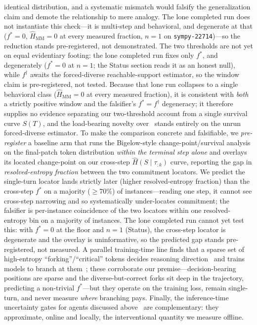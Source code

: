\documentclass[11pt]{article}
\newcommand{\strat}{S}
\newcommand{\prefix}{\tau_{:k}}
\begin{document}
identical distribution, and a systematic mismatch would falsify the generalization
claim and demote the relationship to mere analogy. The lone completed run does not
instantiate this check---it is multi-step and behavioral, and degenerate at that
($f^\ast=0$, $\widehat{H}_{\mathrm{MM}}=0$ at every measured fraction, $n\!=\!1$ on
\texttt{sympy-22714})---so the reduction stands pre-registered, not demonstrated. The two thresholds
are not yet on equal evidentiary footing: the lone completed run fixes only $f^\ast$,
and degenerately ($f^\ast=0$ at $n\!=\!1$; the Status section reads it as an honest
null), while $f^\dagger$ awaits the forced-diverse reachable-support estimator, so the
window claim is pre-registered, not tested. Because that lone run collapses to a
single behavioral class ($\widehat{H}_{\mathrm{MM}}=0$ at every measured fraction),
it is consistent with \emph{both} a strictly positive window and the falsifier's
$f^\ast=f^\dagger$ degeneracy; it therefore supplies no evidence separating our
two-threshold account from a single survival curve $S(T)$, and the load-bearing
novelty over~\citep{bigelow2024forking} stands entirely on the unrun forced-diverse
estimator. To make the comparison concrete and falsifiable, we \emph{pre-register} a
baseline arm that runs the Bigelow-style change-point/survival analysis on the
final-patch token distribution \emph{within the terminal step alone} and overlays its
located change-point on our cross-step $\widehat{H}(\strat\mid\prefix)$ curve,
reporting the gap in \emph{resolved-entropy fraction} between the two commitment
locators. We predict the single-turn locator lands strictly later (higher
resolved-entropy fraction) than the cross-step $f^\ast$ on a majority
($\geq\!70\%$) of instances---reading one step, it cannot see cross-step narrowing
and so systematically under-locates commitment; the falsifier is per-instance
coincidence of the two locators within one resolved-entropy bin on a majority of
instances. The lone completed run cannot yet test this: with $f^\ast=0$ at the floor
and $n\!=\!1$ (Status), the cross-step locator is degenerate and the overlay is
uninformative, so the predicted gap stands pre-registered, not measured. A
parallel training-time line finds that a sparse set of high-entropy
``forking''/``critical'' tokens decides reasoning
direction~\citep{wang2025highentropy,lin2024critical} and trains models to branch at
them~\citep{jia2025globalforking}; these corroborate our premise---decision-bearing
positions are sparse and the diverse-but-correct forks sit deep in the
trajectory, predicting a non-trivial $f^\ast$---but they operate on the training
loss, remain single-turn, and never measure \emph{where} branching pays. Finally,
the inference-time uncertainty gates for agents discussed
above~\citep{egb2025,catts2026,learnwhentoplan2025} are complementary: they
approximate, online and locally, the interventional quantity we measure offline.
\end{document}
